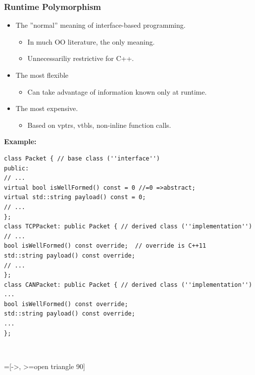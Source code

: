 \subsubsection{Runtime Polymorphism}
\begin{itemize}
  \item The ''normal'' meaning of interface-based programming.
  \begin{itemize}
    \item In much OO literature, the only meaning.
    \item Unnecessariliy restrictive for C++.
  \end{itemize}
  \item The most flexible
  \begin{itemize}
    \item Can take advantage of information known only at runtime.
  \end{itemize}
  \item The most expensive.
  \begin{itemize}
    \item Based on vptrs, vtbls, non-inline function calls.
  \end{itemize}
\end{itemize}
\pagebreak
\textbf{Example:}\\
\begin{minipage}{11cm}
\begin{lstlisting}
class Packet { // base class (''interface'')
public:
// ...
virtual bool isWellFormed() const = 0 //=0 =>abstract;
virtual std::string payload() const = 0;
// ...
};
class TCPPacket: public Packet { // derived class (''implementation'')
// ...
bool isWellFormed() const override;  // override is C++11
std::string payload() const override;
// ...
};
class CANPacket: public Packet { // derived class (''implementation'')
...
bool isWellFormed() const override;
std::string payload() const override;
...
};
\end{lstlisting}
\end{minipage}~
\begin{minipage}{9cm}
=[->, >=open triangle 90]
\end{minipage}

